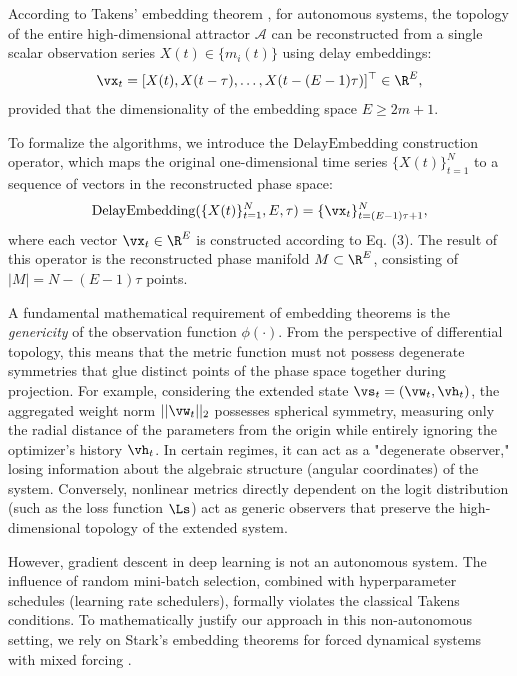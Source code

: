 \documentclass{article}
\begin{document}
According to Takens' embedding theorem \cite{takens1981detecting}, for autonomous systems, the topology of the entire high-dimensional attractor $\mathcal{A}$ can be reconstructed from a single scalar observation series $X(t) \in \{m_i(t)\}$ using delay embeddings:
\begin{equation}
    \vx_t =[X(t), X(t-\tau), \dots, X(t-(E-1)\tau)]^\top \in \R^E,
\end{equation}
provided that the dimensionality of the embedding space $E \ge 2m + 1$.

To formalize the algorithms, we introduce the $\text{DelayEmbedding}$ construction operator, which maps the original one-dimensional time series $\{X(t)\}_{t=1}^N$ to a sequence of vectors in the reconstructed phase space:
\begin{equation}
    \text{DelayEmbedding}(\{X(t)\}_{t=1}^N, E, \tau) = \{ \vx_t \}_{t=(E-1)\tau + 1}^{N},
\end{equation}
where each vector $\vx_t \in \R^E$ is constructed according to Eq. (3). The result of this operator is the reconstructed phase manifold $M \subset \R^E$, consisting of $|M| = N - (E-1)\tau$ points.

A fundamental mathematical requirement of embedding theorems is the \textit{genericity} of the observation function $\phi(\cdot)$. From the perspective of differential topology, this means that the metric function must not possess degenerate symmetries that glue distinct points of the phase space together during projection. For example, considering the extended state $\vs_t = (\vw_t, \vh_t)$, the aggregated weight norm $||\vw_t||_2$ possesses spherical symmetry, measuring only the radial distance of the parameters from the origin while entirely ignoring the optimizer's history $\vh_t$. In certain regimes, it can act as a "degenerate observer," losing information about the algebraic structure (angular coordinates) of the system. Conversely, nonlinear metrics directly dependent on the logit distribution (such as the loss function $\Ls$) act as generic observers that preserve the high-dimensional topology of the extended system.

However, gradient descent in deep learning is not an autonomous system. The influence of random mini-batch selection, combined with hyperparameter schedules (learning rate schedulers), formally violates the classical Takens conditions. To mathematically justify our approach in this non-autonomous setting, we rely on Stark's embedding theorems for forced dynamical systems with mixed forcing \cite{stark1999delay, stark2003delay}.
\end{document}
